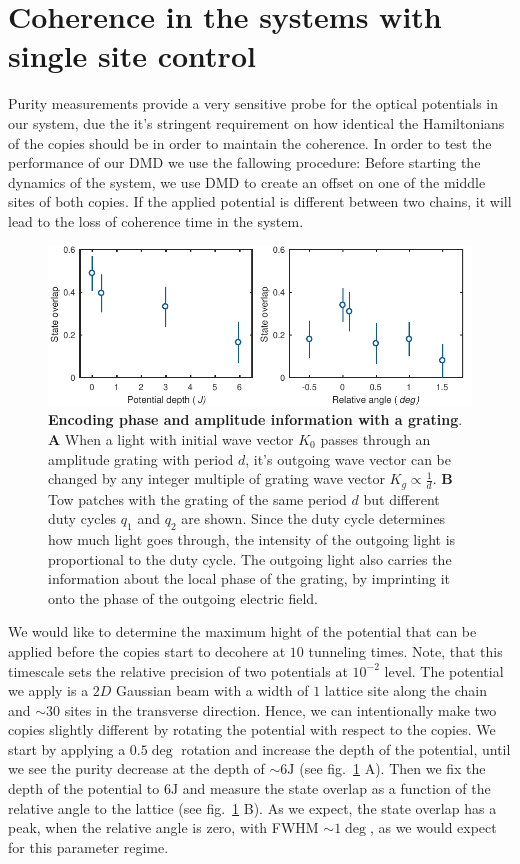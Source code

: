 \section{Coherence in the systems with single site control} 
Purity measurements provide a very sensitive probe for the optical potentials in our system, due the it's stringent requirement on how identical the Hamiltonians of the copies should be in order to maintain the coherence. In order to test the performance of our DMD we use the fallowing procedure: Before starting the dynamics of the system, we use DMD to create an offset on one of the middle sites of both copies. If the applied potential is different between two chains, it will lead to the loss of coherence time in the system.

\begin{figure}[t]
	\centering
	\includegraphics[scale=1]{figures/CBH_pattern_rotation.pdf}
	\caption{{\bf Encoding phase and amplitude information with a grating}. {\bf A} When a light with initial wave vector $K_0$ passes through an amplitude grating with period $d$, it's outgoing wave vector can be changed by any integer multiple of grating wave vector $K_g\propto \frac{1}{d}$. {\bf B} Tow patches with the grating of the same period $d$ but different duty cycles $q_1$ and $q_2$ are shown. Since the duty cycle determines how much light goes through, the intensity of the outgoing light is proportional to the duty cycle. The outgoing light also carries the information about the local phase of the grating, by imprinting it onto the phase of the outgoing electric field.}
	\label{fig:CBH_pattern_rotation}
\end{figure}

We would like to determine the maximum hight of the potential that can be applied before the copies start to decohere at $10$ tunneling times. Note, that this timescale sets the relative precision of two potentials at $10^{-2}$ level. The potential we apply is a $2D$ Gaussian beam with a width of $1$ lattice site along the chain and $\sim 30$ sites in the transverse direction. Hence, we can intentionally make two copies slightly different by rotating the potential with respect to the copies. We start by applying a $0.5\deg$ rotation and increase the depth of the potential, until we see the purity decrease at the depth of $\sim 6\mathrm{J}$ (see fig.~\ref{fig:CBH_pattern_rotation} A). Then we fix the depth of the potential to $6\mathrm{J}$ and measure the state overlap as a function of the relative angle to the lattice (see fig.~\ref{fig:CBH_pattern_rotation} B). As we expect, the state overlap has a peak, when the relative angle is zero, with FWHM $\sim 1\deg$, as we would expect for this parameter regime.

